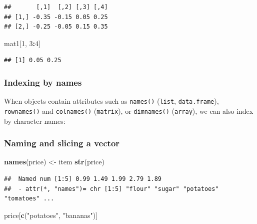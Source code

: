 \documentclass[
  11pt,
]{article}
\newenvironment{Shaded}{\begin{snugshade}}{\end{snugshade}}
\newcommand{\DecValTok}[1]{\textcolor[rgb]{0.00,0.00,0.81}{#1}}
\newcommand{\FunctionTok}[1]{\textcolor[rgb]{0.13,0.29,0.53}{\textbf{#1}}}
\newcommand{\NormalTok}[1]{#1}
\newcommand{\OtherTok}[1]{\textcolor[rgb]{0.56,0.35,0.01}{#1}}
\newcommand{\SpecialCharTok}[1]{\textcolor[rgb]{0.81,0.36,0.00}{\textbf{#1}}}
\newcommand{\StringTok}[1]{\textcolor[rgb]{0.31,0.60,0.02}{#1}}
\begin{document}
\begin{verbatim}
##       [,1]  [,2] [,3] [,4]
## [1,] -0.35 -0.15 0.05 0.25
## [2,] -0.25 -0.05 0.15 0.35
\end{verbatim}

\begin{Shaded}
\begin{Highlighting}[]
\NormalTok{mat1[}\DecValTok{1}\NormalTok{, }\DecValTok{3}\SpecialCharTok{:}\DecValTok{4}\NormalTok{]}
\end{Highlighting}
\end{Shaded}

\begin{verbatim}
## [1] 0.05 0.25
\end{verbatim}

\hypertarget{indexing-by-names}{%
\subsubsection{Indexing by names}\label{indexing-by-names}}

When objects contain attributes such as \texttt{names()} (\texttt{list}, \texttt{data.frame}), \texttt{rownames()} and \texttt{colnames()} (\texttt{matrix}), or \texttt{dimnames()} (\texttt{array}), we can also index by character names:

\hypertarget{naming-and-slicing-a-vector}{%
\subsubsection{Naming and slicing a vector}\label{naming-and-slicing-a-vector}}

\begin{Shaded}
\begin{Highlighting}[]
\FunctionTok{names}\NormalTok{(price) }\OtherTok{\textless{}{-}}\NormalTok{ item}
\FunctionTok{str}\NormalTok{(price)}
\end{Highlighting}
\end{Shaded}

\begin{verbatim}
##  Named num [1:5] 0.99 1.49 1.99 2.79 1.89
##  - attr(*, "names")= chr [1:5] "flour" "sugar" "potatoes" "tomatoes" ...
\end{verbatim}

\begin{Shaded}
\begin{Highlighting}[]
\NormalTok{price[}\FunctionTok{c}\NormalTok{(}\StringTok{"potatoes"}\NormalTok{, }\StringTok{"bananas"}\NormalTok{)]}
\end{Highlighting}
\end{Shaded}
\end{document}
